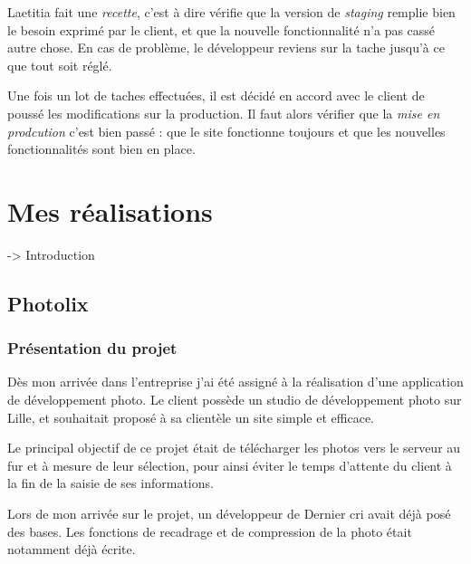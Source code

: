 \bigskip

Laetitia fait une \emph{recette}, c'est à dire vérifie que la version de
\emph{staging} remplie bien le besoin exprimé par le client, et que la
nouvelle fonctionnalité n'a pas cassé autre chose. En cas de problème,
le développeur reviens sur la tache jusqu'à ce que tout soit réglé.

\bigskip

Une fois un lot de taches effectuées, il est décidé en accord avec le
client de poussé les modifications sur la production. Il faut alors
vérifier que la \emph{mise en prodcution} c'est bien passé : que le site
fonctionne toujours et que les nouvelles fonctionnalités sont bien en
place.

\newpage

\section{Mes réalisations}\label{mes-ruxe9alisations}

\bigskip

-\textgreater{} Introduction

\subsection{Photolix}\label{photolix}

\subsubsection{Présentation du projet}\label{pruxe9sentation-du-projet}

\bigskip

Dès mon arrivée dans l'entreprise j'ai été assigné à la réalisation
d'une application de développement photo. Le client possède un studio de
développement photo sur Lille, et souhaitait proposé à sa clientèle un
site simple et efficace.

\bigskip

Le principal objectif de ce projet était de télécharger les photos vers
le serveur au fur et à mesure de leur sélection, pour ainsi éviter le
temps d'attente du client à la fin de la saisie de ses informations.

\bigskip

Lors de mon arrivée sur le projet, un développeur de Dernier cri avait
déjà posé des bases. Les fonctions de recadrage et de compression de la
photo était notamment déjà écrite.

\bigskip

